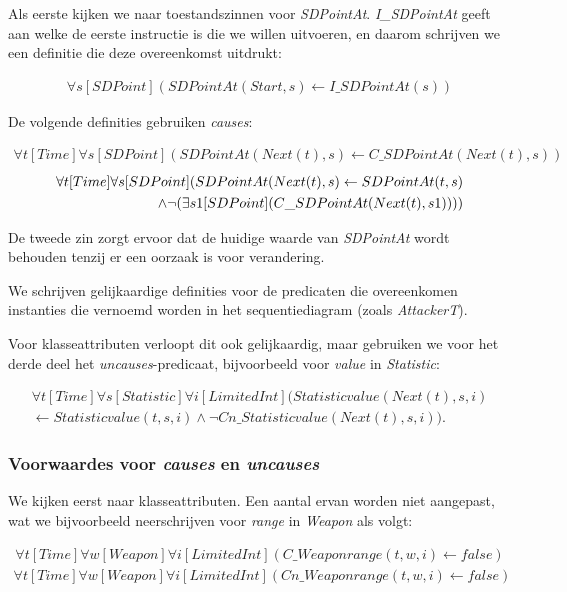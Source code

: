 Als eerste kijken we naar toestandszinnen voor \textit{SDPointAt}. \textit{I\_SDPointAt} geeft aan welke de eerste instructie is die we willen uitvoeren, en daarom schrijven we een definitie die deze overeenkomst uitdrukt:

\begin{align*}
	\forall{s}[SDPoint](SDPointAt(Start, s) \leftarrow I\_SDPointAt(s))
\end{align*}


De volgende definities gebruiken \textit{causes}:

\begin{align*}
	\forall{t}[Time]\forall{s}[SDPoint](SDPointAt(Next(t), s) \leftarrow C\_SDPointAt(Next(t), s))
\end{align*}
\begin{align*}
	\forall{t}[Time]\forall{s}[SDPoint](SDPointAt(Next(t), s) \leftarrow SDPointAt(t, s) \\ \land{} \space \lnot{}(\exists{s1}[SDPoint](C\_SDPointAt(Next(t), s1))))
\end{align*}

De tweede zin zorgt ervoor dat de huidige waarde van \textit{SDPointAt} wordt behouden tenzij er een oorzaak is voor verandering.

We schrijven gelijkaardige definities voor de predicaten die overeenkomen instanties die vernoemd worden in het sequentiediagram (zoals \textit{AttackerT}).

\parbreak

Voor klasseattributen verloopt dit ook gelijkaardig, maar gebruiken we voor het derde deel het \textit{uncauses}-predicaat, bijvoorbeeld voor \textit{value} in \textit{Statistic}:

\begin{align*}
	\forall{t}[Time]\forall{s}[Statistic]\forall{i}[LimitedInt](Statisticvalue(Next(t), s, i) \\ \leftarrow Statisticvalue(t, s, i) \land \lnot Cn\_Statisticvalue(Next(t), s, i)).
\end{align*}

\subsubsection{Voorwaardes voor \textit{causes} en \textit{uncauses}}
We kijken eerst naar klasseattributen. Een aantal ervan worden niet aangepast, wat we bijvoorbeeld neerschrijven voor \textit{range} in \textit{Weapon} als volgt:

\begin{align*}
	\forall{t}[Time]\forall{w}[Weapon]\forall{i}[LimitedInt](C\_Weaponrange(t, w, i) \leftarrow false)
\end{align*}
\begin{align*}
	\forall{t}[Time]\forall{w}[Weapon]\forall{i}[LimitedInt](Cn\_Weaponrange(t, w, i) \leftarrow false)
\end{align*}

